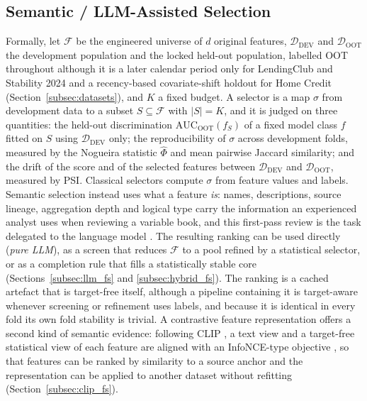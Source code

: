 \documentclass[final,5p,twocolumn]{elsarticle}
\newcommand{\Kfeat}{K}
\newcommand{\AUC}{\mathrm{AUC}}
\begin{document}
\subsection{Semantic / LLM-Assisted Selection}
\label{subsec:llm_fs_background}

Formally, let $\mathcal{F}$ be the engineered universe of $d$ original features, $\mathcal{D}_{\mathrm{DEV}}$ and $\mathcal{D}_{\mathrm{OOT}}$ the development population and the locked held-out population, labelled OOT throughout although it is a later calendar period only for LendingClub and Stability 2024 and a recency-based covariate-shift holdout for Home Credit (Section~\ref{subsec:datasets}), and $\Kfeat$ a fixed budget. A selector is a map $\sigma$ from development data to a subset $S\subseteq\mathcal{F}$ with $|S|=\Kfeat$, and it is judged on three quantities: the held-out discrimination $\AUC_{\mathrm{OOT}}(f_S)$ of a fixed model class $f$ fitted on $S$ using $\mathcal{D}_{\mathrm{DEV}}$ only; the reproducibility of $\sigma$ across development folds, measured by the Nogueira statistic $\hat\Phi$ and mean pairwise Jaccard similarity; and the drift of the score and of the selected features between $\mathcal{D}_{\mathrm{DEV}}$ and $\mathcal{D}_{\mathrm{OOT}}$, measured by PSI. Classical selectors compute $\sigma$ from feature values and labels. Semantic selection instead uses what a feature \emph{is}: names, descriptions, source lineage, aggregation depth and logical type carry the information an experienced analyst uses when reviewing a variable book, and this first-pass review is the task delegated to the language model \cite{jeong2025,li2025sigkdd}. The resulting ranking can be used directly (\emph{pure LLM}), as a screen that reduces $\mathcal{F}$ to a pool refined by a statistical selector, or as a completion rule that fills a statistically stable core (Sections~\ref{subsec:llm_fs} and \ref{subsec:hybrid_fs}). The ranking is a cached artefact that is target-free itself, although a pipeline containing it is target-aware whenever screening or refinement uses labels, and because it is identical in every fold its own fold stability is trivial. A contrastive feature representation offers a second kind of semantic evidence: following CLIP \cite{radford2021}, a text view and a target-free statistical view of each feature are aligned with an InfoNCE-type objective \cite{oord2018}, so that features can be ranked by similarity to a source anchor and the representation can be applied to another dataset without refitting (Section~\ref{subsec:clip_fs}).
\end{document}
